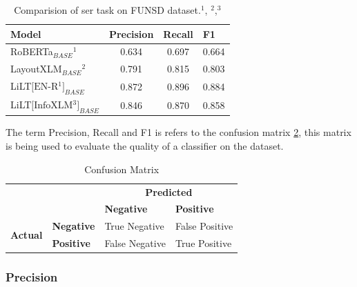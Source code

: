 \begin{table}[H]
    \centering
    \captionsetup{justification=centering}
    \begin{tabular}{lccl}
    \hline
    \textbf{Model}& \textbf{Precision} & \textbf{Recall} & \textbf{F1} \\ \toprule
     RoBERTa\(_{BASE}\)$^1$ & 0.634 & 0.697 &0.664 \\
     LayoutXLM\(_{BASE}\)$^2$ & 0.791 & 0.815 & 0.803 \\
     \hline
     LiLT\(\text{[EN-R$^1$]}_{BASE}\) &  0.872&  0.896& 0.884 \\ 
     LiLT\(\text{[InfoXLM$^3$]}_{BASE}\) & 0.846 & 0.870 & 0.858 \\ \bottomrule
    \end{tabular}
    \caption{Comparision of \acrfull{ser} task on FUNSD \cite{jaume2019funsd} dataset.$^1$\cite{liu2019roberta}, $^2$\cite{xu2021layoutxlm},$^3$\cite{chi2020infoxlm}}
    \label{tab:pre-trained_model_comparision}
\end{table}

The term Precision, Recall and F1 is refers to the confusion matrix \ref{tab:Confusion Matrix}, this matrix is being used to evaluate the quality of a classifier on the dataset. 

\begin{table}[H]
\centering
\begin{tabular}{llll}
                                       &                       & \multicolumn{2}{c}{\textbf{Predicted}}                          \\ \cline{3-4} 
                                       & \multicolumn{1}{l|}{} & \multicolumn{1}{l|}{\textbf{Negative}} & \multicolumn{1}{l|}{\textbf{Positive}} \\ \cline{2-4} 
\multicolumn{1}{l|}{\multirow{2}{*}{\textbf{Actual}}} & \multicolumn{1}{l|}{\textbf{Negative}} & \multicolumn{1}{l|}{True Negative} & \multicolumn{1}{l|}{False Positive} \\ \cline{2-4} 
\multicolumn{1}{l|}{}                  & \multicolumn{1}{l|}{\textbf{Positive}} & \multicolumn{1}{l|}{False Negative} & \multicolumn{1}{l|}{True Positive} \\ \cline{2-4} 
\end{tabular}
\caption{Confusion Matrix}
\label{tab:Confusion Matrix}
\end{table}

\subsubsection{Precision}

